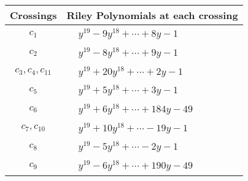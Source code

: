 \documentclass[1p]{elsarticle_modified}
\theoremstyle{definition}
\begin{document}
\begin{tabular}{m{50pt}|m{274pt}}
Crossings & \hspace{64pt}Riley Polynomials at each crossing \\
\hline $$\begin{aligned}c_{1}\end{aligned}$$&$\begin{aligned}
&y^{19}-9 y^{18}+\cdots+8 y-1
\end{aligned}$\\
\hline $$\begin{aligned}c_{2}\end{aligned}$$&$\begin{aligned}
&y^{19}-8 y^{18}+\cdots+9 y-1
\end{aligned}$\\
\hline $$\begin{aligned}c_{3},c_{4},c_{11}\end{aligned}$$&$\begin{aligned}
&y^{19}+20 y^{18}+\cdots+2 y-1
\end{aligned}$\\
\hline $$\begin{aligned}c_{5}\end{aligned}$$&$\begin{aligned}
&y^{19}+5 y^{18}+\cdots+3 y-1
\end{aligned}$\\
\hline $$\begin{aligned}c_{6}\end{aligned}$$&$\begin{aligned}
&y^{19}+6 y^{18}+\cdots+184 y-49
\end{aligned}$\\
\hline $$\begin{aligned}c_{7},c_{10}\end{aligned}$$&$\begin{aligned}
&y^{19}+10 y^{18}+\cdots-19 y-1
\end{aligned}$\\
\hline $$\begin{aligned}c_{8}\end{aligned}$$&$\begin{aligned}
&y^{19}-5 y^{18}+\cdots-2 y-1
\end{aligned}$\\
\hline $$\begin{aligned}c_{9}\end{aligned}$$&$\begin{aligned}
&y^{19}-6 y^{18}+\cdots+190 y-49
\end{aligned}$\\
\hline
\end{tabular}\\~\\
\end{document}
